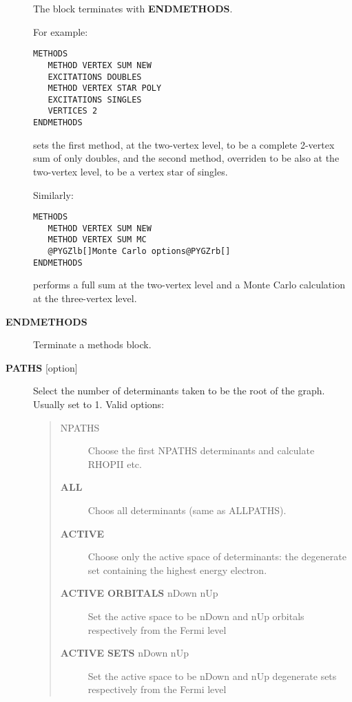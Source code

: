 \documentclass[openany,a4paper,10pt,english]{manual}
\begin{document}
\begin{description}
The block terminates with \textbf{ENDMETHODS}.

For example:

\begin{Verbatim}[commandchars=@\[\]]
METHODS
   METHOD VERTEX SUM NEW
   EXCITATIONS DOUBLES
   METHOD VERTEX STAR POLY
   EXCITATIONS SINGLES
   VERTICES 2
ENDMETHODS
\end{Verbatim}

sets the first method, at the two-vertex level, to be a complete 2-vertex
sum of only doubles, and the second method, overriden to be also at
the two-vertex level, to be a vertex star of singles.

Similarly:

\begin{Verbatim}[commandchars=@\[\]]
METHODS
   METHOD VERTEX SUM NEW
   METHOD VERTEX SUM MC
   @PYGZlb[]Monte Carlo options@PYGZrb[]
ENDMETHODS
\end{Verbatim}

performs a full sum at the two-vertex level and a Monte Carlo
calculation at the three-vertex level.

\item[\textbf{ENDMETHODS}] \leavevmode
Terminate a methods block.

\item[\textbf{PATHS} {[}option{]}] \leavevmode
Select the number of determinants taken to be the root of the graph.
Usually set to 1.  Valid options:
\begin{quote}
\begin{description}
\item[NPATHS] \leavevmode
Choose the first NPATHS determinants and calculate RHOPII etc.

\item[\textbf{ALL}] \leavevmode
Choos all determinants (same as ALLPATHS).

\item[\textbf{ACTIVE}] \leavevmode
Choose only the active space of determinants: the degenerate
set containing the highest energy electron.

\item[\textbf{ACTIVE} \textbf{ORBITALS} nDown nUp] \leavevmode
Set the active space to be nDown and nUp orbitals respectively
from the Fermi level

\item[\textbf{ACTIVE} \textbf{SETS} nDown nUp] \leavevmode
Set the active space to be nDown and nUp degenerate sets
respectively from the Fermi level


\end{description}
\end{quote}
\end{description}
\end{document}
